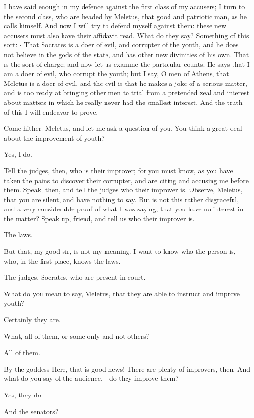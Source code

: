 \documentclass[11pt]{article}
\begin{document}
I have said enough in my defence against the first class of my accusers; I turn to the second class, who are headed by Meletus, that good and patriotic man, as he calls himself. And now I will try to defend myself against them: these new accusers must also have their affidavit read. What do they say? Something of this sort: - That Socrates is a doer of evil, and corrupter of the youth, and he does not believe in the gods of the state, and has other new divinities of his own. That is the sort of charge; and now let us examine the particular counts. He says that I am a doer of evil, who corrupt the youth; but I say, O men of Athens, that Meletus is a doer of evil, and the evil is that he makes a joke of a serious matter, and is too ready at bringing other men to trial from a pretended zeal and interest about matters in which he really never had the smallest interest. And the truth of this I will endeavor to prove.

Come hither, Meletus, and let me ask a question of you. You think a great deal about the improvement of youth?

Yes, I do.

Tell the judges, then, who is their improver; for you must know, as you have taken the pains to discover their corrupter, and are citing and accusing me before them. Speak, then, and tell the judges who their improver is. Observe, Meletus, that you are silent, and have nothing to say. But is not this rather disgraceful, and a very considerable proof of what I was saying, that you have no interest in the matter? Speak up, friend, and tell us who their improver is.

The laws.

But that, my good sir, is not my meaning. I want to know who the person is, who, in the first place, knows the laws.

The judges, Socrates, who are present in court.

What do you mean to say, Meletus, that they are able to instruct and improve youth?

Certainly they are.

What, all of them, or some only and not others?

All of them.

By the goddess Here, that is good news! There are plenty of improvers, then. And what do you say of the audience, - do they improve them?

Yes, they do.

And the senators?
\end{document}

